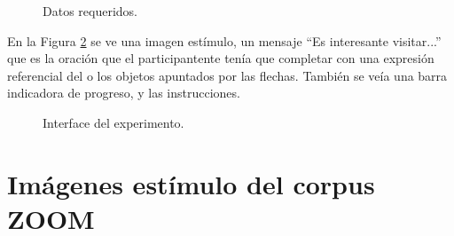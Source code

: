 \begin{figure}[t]
\begin{center}
\caption{Datos requeridos.}
\label{fig-nacionalidadGenero}
\end{center}
\end{figure}

En la Figura \ref{fig-interface} se ve una imagen est\'imulo, un mensaje ``Es interesante visitar...'' que es la oraci\'on que el participantente ten\'ia que completar con una expresi\'on referencial del o los objetos apuntados por las flechas. Tambi\'en se ve\'ia una barra indicadora de progreso, y las instrucciones. 

\begin{figure}[h]
\begin{center}
\caption{Interface del experimento.}
\label{fig-interface}
\end{center}
\end{figure}

\section{Im\'agenes est\'imulo del corpus ZOOM}\label{imagenes-zoom}

